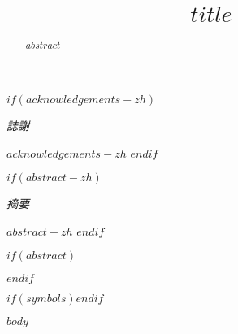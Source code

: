\documentclass[a4paper, 11pt, oneside]{Thesis}
\title{$title$}
\begin{document}
\frontmatter
\maketitle

$if(acknowledgements-zh)$
\thispagestyle{empty}
\vfil\null
\begin{center}
  {\huge{\textit{誌謝}} \par}
  \bigskip
\end{center}
{\normalsize $acknowledgements-zh$}
\vfil\vfil\vfil\null
\cleardoublepage
$endif$

$if(abstract-zh)$
\thispagestyle{empty}
\vfil\null
\begin{center}
  {\huge{\textit{摘要}} \par}
  \bigskip
\end{center}
{\normalsize $abstract-zh$}
\vfil\vfil\vfil\null
\cleardoublepage
$endif$

$if(abstract)$
\begin{abstract}
$abstract$
\end{abstract}
$endif$

\tableofcontents
\listoffigures
\listoftables
$if(symbols)$$endif$

\mainmatter
$body$



\backmatter
\end{document}
